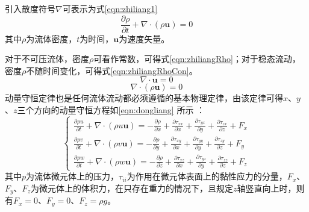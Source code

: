 引入散度符号$\nabla$可表示为式\ref{eqn:zhiliang1}
	\begin{equation}
		\label{eqn:zhiliang1}
		\frac{\partial\rho}{\partial t}+\nabla \cdot (\rho \mathbf{u}) =0
	\end{equation}
其中$\rho$为流体密度，$t$为时间，$\mathbf{u}$为速度矢量。

对于不可压流体，密度$\rho$可看作常数，可得式\ref{eqn:zhiliangRho}；对于稳态流动，密度$\rho$不随时间变化，可得式\ref{eqn:zhiliangRhoCon}。
	\begin{equation}
		\label{eqn:zhiliangRho}
		\nabla \cdot \mathbf{u} =0
	\end{equation}
	\begin{equation}
		\label{eqn:zhiliangRhoCon}
		\nabla \cdot (\rho \mathbf{u}) =0
	\end{equation}
动量守恒定律也是任何流体流动都必须遵循的基本物理定律，由该定律可得$x$、$y$、$z$三个方向的动量守恒方程如\ref{eqn:dongliang} 所示\supercite{ComsolCfd2015,WangFujun2004} ：
	\begin{equation}
		\label{eqn:dongliang}
		\left\{
		\begin{aligned}
		\frac{\partial \rho u}{\partial t}+\nabla \cdot (\rho u \mathbf{u}) = - \frac{\partial \rho}{\partial x}+\frac{\partial \tau_{xx}}{\partial x}+\frac{\partial \tau_{yx}}{\partial y}+\frac{\partial \tau_{zx}}{\partial z} + F_x \\
		\frac{\partial \rho v}{\partial t}+\nabla \cdot (\rho v \mathbf{u}) = - \frac{\partial \rho}{\partial y}+\frac{\partial \tau_{xy}}{\partial x}+\frac{\partial \tau_{yy}}{\partial y}+\frac{\partial \tau_{zy}}{\partial z} + F_y \\
		\frac{\partial \rho w}{\partial t}+\nabla \cdot (\rho w \mathbf{u}) = - \frac{\partial \rho}{\partial z}+\frac{\partial \tau_{xz}}{\partial x}+\frac{\partial \tau_{yz}}{\partial y}+\frac{\partial \tau_{zz}}{\partial z} + F_z 
		\end{aligned}
		\right.
	\end{equation}
其中$p$为流体微元体上的压力，$\tau_{ii}$为作用在微元体表面上的黏性应力的分量，$F_x$、$F_y$、$F_z$为微元体上的体积力，在只存在重力的情况下，且规定$z$轴竖直向上时，则有$F_x=0$、$F_y=0$、$F_z=\rho g$。

